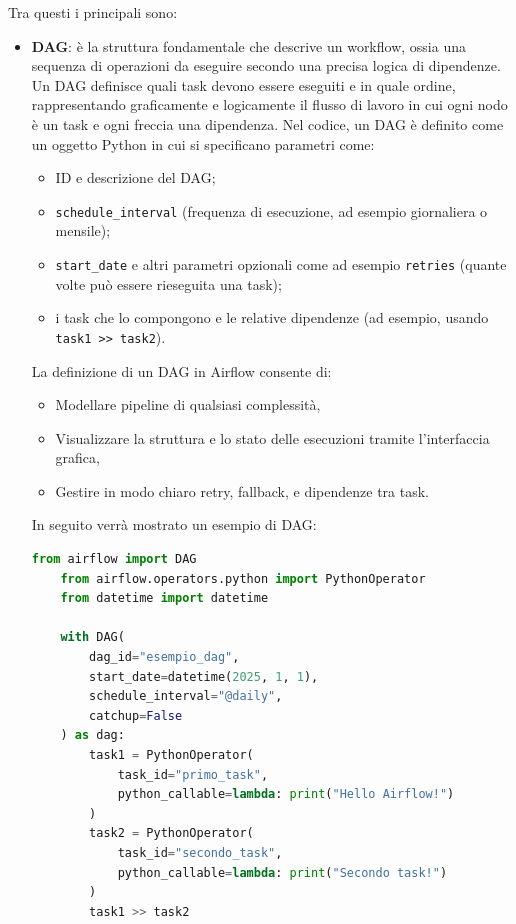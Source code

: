 Tra questi i principali sono:
\begin{itemize}
    \item \textbf{DAG}: è la struttura fondamentale che descrive un workflow, ossia una sequenza di operazioni da eseguire secondo una precisa logica di dipendenze.
    Un DAG definisce quali task devono essere eseguiti e in quale ordine, rappresentando graficamente e logicamente il flusso di lavoro in cui ogni nodo è un task e ogni freccia una dipendenza. 
    Nel codice, un DAG è definito come un oggetto Python in cui si specificano parametri come:
    \begin{itemize}
        \item ID e descrizione del DAG;
        \item \texttt{schedule\_interval} (frequenza di esecuzione, ad esempio giornaliera o mensile);
        \item \texttt{start\_date} e altri parametri opzionali come ad esempio \texttt{retries} (quante volte può essere rieseguita una task);
        \item i task che lo compongono e le relative dipendenze (ad esempio, usando \texttt{task1 >> task2}).
    \end{itemize}
    
    La definizione di un DAG in Airflow consente di:
    \begin{itemize}
        \item Modellare pipeline di qualsiasi complessità,
        \item Visualizzare la struttura e lo stato delle esecuzioni tramite l'interfaccia grafica,
        \item Gestire in modo chiaro retry, fallback, e dipendenze tra task.
    \end{itemize}
    
    In seguito verrà mostrato un esempio di DAG:
    
    \begin{lstlisting}[language=Python, basicstyle=\scriptsize\ttfamily, caption={Esempio di DAG in Airflow}, label={lst:dag_example}]
    from airflow import DAG
    from airflow.operators.python import PythonOperator
    from datetime import datetime

    with DAG(
        dag_id="esempio_dag",
        start_date=datetime(2025, 1, 1),
        schedule_interval="@daily",
        catchup=False
    ) as dag:
        task1 = PythonOperator(
            task_id="primo_task",
            python_callable=lambda: print("Hello Airflow!")
        )
        task2 = PythonOperator(
            task_id="secondo_task",
            python_callable=lambda: print("Secondo task!")
        )
        task1 >> task2
    \end{lstlisting}
    

\end{itemize}
